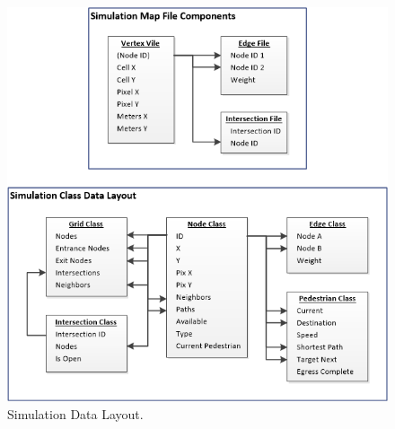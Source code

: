 \documentclass[12pt]{article}
\begin{document}
\begin{figure}[H]
  \includegraphics[width=\linewidth,natwidth=603,natheight=625]{DataLayout.png}
  \caption{Simulation Data Layout.}
  \label{fig:datalayout}
\end{figure}
\end{document}
